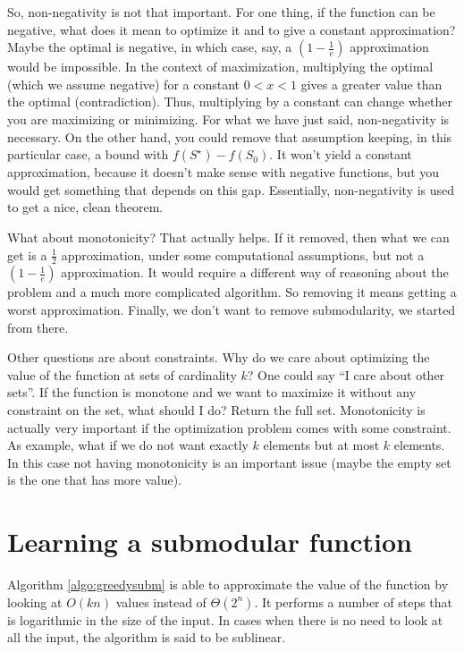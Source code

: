 So, non-negativity is not that important. For one thing, if the function can be negative, what does it mean to optimize it and to give a constant approximation? Maybe the optimal is negative, in which case, say, a $\left(1-\frac{1}{e}\right)$ approximation would be impossible. In the context of maximization, multiplying the optimal (which we assume negative) for a constant $0 < x < 1$ gives a greater value than the optimal (contradiction). Thus, multiplying by a constant can change whether you are maximizing or minimizing. For what we have just said, non-negativity is necessary. On the other hand, you could remove that assumption keeping, in this particular case, a bound with $f(S^\star) - f(S_0)$. It won't yield a constant approximation, because it doesn't make sense with negative functions, but you would get something that depends on this gap. Essentially, non-negativity is used to get a nice, clean theorem.

What about monotonicity? That actually helps. If it removed, then what we can get is a $\frac{1}{2}$ approximation, under some computational assumptions, but not a $\left(1-\frac{1}{e}\right)$ approximation. It would require a different way of reasoning about the problem and a much more complicated algorithm. So removing it means getting a worst approximation. Finally, we don't want to remove submodularity, we started from there.

Other questions are about constraints. Why do we care about optimizing the value of the function at sets of cardinality $k$? One could say ``I care about other sets''. If the function is monotone and we want to maximize it without any constraint on the set, what should I do? Return the full set. Monotonicity is actually very important if the optimization problem comes with some constraint. As example, what if we do not want exactly $k$ elements but at most $k$ elements. In this case not having monotonicity is an important issue (maybe the empty set is the one that has more value).

\section{Learning a submodular function}

Algorithm \ref{algo:greedysubm} is able to approximate the value of the function by looking at $O(kn)$ values instead of $\Theta(2^n)$. It performs a number of steps that is logarithmic in the size of the input. In cases when there is no need to look at all the input, the algorithm is said to be sublinear.

